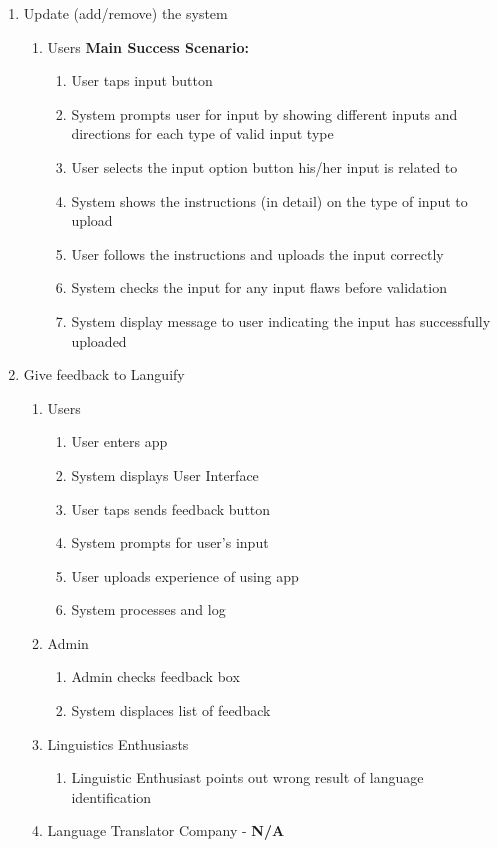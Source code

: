 \begin{enumerate}[{\bf BE1:}]
	

	\item Update (add/remove) the system
	\begin{enumerate}[{\bf VP1.}]
		\item Users
		\textbf{Main Success Scenario:}
		\begin{enumerate}[{\bf 1.}]
			\item User taps input button 
			\item System prompts user for input by showing different inputs and directions for each type of valid input type
			\item User selects the input option button his/her input is  related to
			\item System shows the instructions (in detail) on the type of input to upload
			\item User follows the instructions and uploads the input correctly
			\item System checks the input for any input flaws before validation
			\item System display message to user indicating the input has successfully uploaded
		\end{enumerate}
	\end{enumerate}

	\item Give feedback to Languify
	\begin{enumerate}[{\bf VP1.}]
		\item Users
		\begin{enumerate}[{\bf 1.}]
			\item User enters app
			\item System displays User Interface
			\item User taps sends feedback button
			\item System prompts for user’s input
			\item User uploads experience of using app
			\item System processes and log
			
		\end{enumerate}
		\item Admin
		\begin{enumerate}[{\bf 1.}, resume]
			\item Admin checks feedback box
			\item System displaces list of feedback
			
		\end{enumerate}
		\item Linguistics Enthusiasts
		\begin{enumerate}[{\bf 4.i}]
			\item Linguistic Enthusiast points out wrong result of language identification
		\end{enumerate}
		\item Language Translator Company - \textbf{N/A}
	\end{enumerate}



\end{enumerate}
